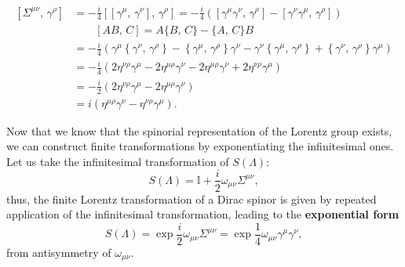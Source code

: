 \[
    \begin{aligned}
        \left[ \Sigma^{\mu \nu},\, \gamma^{\rho}\right] & = -\frac{i}{4} \left[ [\gamma^{\mu},\, \gamma^{\nu}],\, \gamma^{\rho} \right] = -\frac{i}{4} \left( \left[\gamma^{\mu} \gamma^{\nu},\, \gamma^{\rho}\right] - \left[\gamma^{\nu} \gamma^{\mu} ,\, \gamma^{\rho}\right]\right)                                           \\
                                                        & \qquad [AB,\, C] = A\{B,\, C\} - \{A,\, C\}B                                                                                                                                                                                                                            \\
                                                        & = -\frac{i}{4} \left( \gamma^{\mu} \left\{\gamma^{\nu},\,\gamma^{\rho}\right\} - \left\{\gamma^{\mu},\,\gamma^{\rho}\right\} \gamma^{\nu} - \gamma^{\nu} \left\{\gamma^{\mu},\,\gamma^{\rho}\right\} + \left\{\gamma^{\nu},\,\gamma^{\rho}\right\} \gamma^{\mu} \right) \\
                                                        & = -\frac{i}{4} \left( 2 \eta^{\nu \rho} \gamma^{\mu} - 2 \eta^{\mu \rho} \gamma^{\nu} - 2 \eta^{\mu \rho} \gamma^{\nu} + 2 \eta^{\nu \rho} \gamma^{\mu} \right)                                                                                                         \\
                                                        & = -\frac{i}{2} \left( 2 \eta^{\nu \rho} \gamma^{\mu} - 2 \eta^{\mu \rho} \gamma^{\nu} \right)                                                                                                                                                                           \\
                                                        & = i \left( \eta^{\mu \rho} \gamma^{\nu} - \eta^{\nu \rho} \gamma^{\mu} \right).
    \end{aligned}
\]

Now that we know that the spinorial representation of the Lorentz group exists, we can construct finite transformations by exponentiating the infinitesimal ones. Let us take the infinitesimal transformation of \(S(\Lambda)\):
\[
    S(\Lambda) = \mathbb{I} + \frac{i}{2} \omega_{\mu \nu} \Sigma^{\mu \nu},
\]
thus, the finite Lorentz transformation of a Dirac spinor is given by repeated application of the infinitesimal transformation, leading to the \textbf{exponential form}
\begin{equation}
    S(\Lambda) = \exp{\frac{i}{2} \omega_{\mu \nu} \Sigma^{\mu \nu}} = \exp{\frac{1}{4} \omega_{\mu \nu} \gamma^{\mu} \gamma^{\nu}},
    \label{eq:finite_lorentz_transformation_spinor}
\end{equation}
from antisymmetry of \(\omega_{\mu \nu}\).

